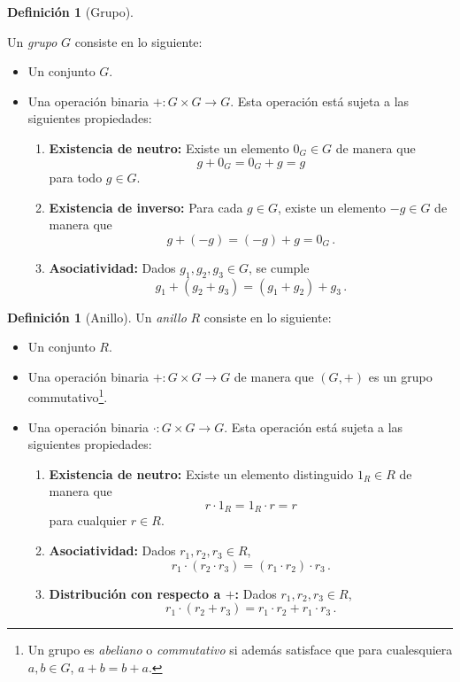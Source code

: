 \documentclass[a4paper,11pt]{amsart}
\theoremstyle{plain}
\theoremstyle{definition}
\newtheorem{defi}[thm]{Definición}
\theoremstyle{remark}
\begin{document}
\begin{defi}[Grupo]$ $\newline

Un \textit{grupo} $G$ consiste en lo siguiente: 
    \begin{itemize}
        \item Un conjunto $G$. 
        \item Una operación binaria $+ \colon G \times G \to G$. Esta operación está sujeta a las siguientes propiedades: 
        \begin{enumerate}[label = \roman*)]
            \item \textbf{Existencia de neutro:} Existe un elemento $0_G \in G$ de manera que 
            \[ g + 0_G = 0_G + g = g \] 
            para todo $g \in G$. 
            \item \textbf{Existencia de inverso:} Para cada $g \in G$, existe un elemento $-g \in G$ de manera que 
            \[ g + (-g) = (-g) + g = 0_G \, .\] 
            \item \textbf{Asociatividad:} Dados $g_1, g_2, g_3 \in G$, se cumple 
            \[ g_1 + (g_2 + g_3) = (g_1 + g_2) + g_3 \, . \]
        \end{enumerate}
    \end{itemize}
    
   
\end{defi}


\begin{defi}[Anillo]
 Un \textit{anillo} $R$ consiste en lo siguiente:
    \begin{itemize}
        \item Un conjunto $R$.
        \item Una operación binaria $+ \colon G \times G \to G$ de manera que $(G, +)$ es un grupo commutativo\footnote{Un grupo es \textit{abeliano} o \textit{commutativo} si además satisface que para cualesquiera $a, b \in G$, $a + b = b + a$.}.
        \item Una operación binaria $\cdot \colon G \times G \to G$. Esta operación está sujeta a las siguientes propiedades: 
        \begin{enumerate}[label = \roman*)]
            \item \textbf{Existencia de neutro:} Existe un elemento distinguido $1_R \in R$ de manera que 
            \[ r \cdot 1_R = 1_R \cdot r = r\]
            para cualquier $r \in R$.
            \item \textbf{Asociatividad:} Dados $r_1, r_2, r_3 \in R$, 
            \[ r_1\cdot (r_2 \cdot r_3) = (r_1 \cdot r_2) \cdot r_3 \, .\]
            \item \textbf{Distribución con respecto a $+$:} Dados $r_1, r_2, r_3 \in R$,
            \[ r_1 \cdot (r_2 + r_3) = r_1 \cdot r_2 + r_1 \cdot r_3 \, . \]
            \end{enumerate}
    \end{itemize}
\end{defi}
\end{document}
